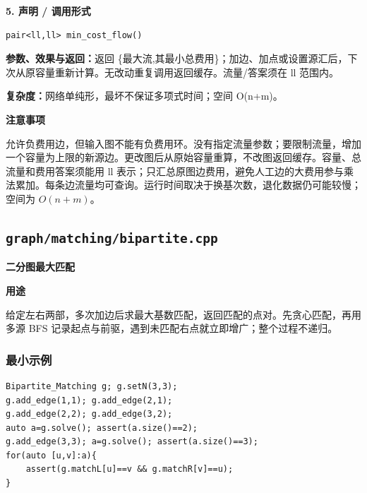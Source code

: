 \documentclass[UTF8,a4paper,10pt]{ctexart}
\newcommand{\TemplUsage}[1]{\textbf{用途}\par #1\par}
\newcommand{\TemplNote}[1]{\textbf{注意事项}\par #1\par}
\begin{document}
\noindent\begin{minipage}{\textwidth}
\textbf{5. 声明 / 调用形式}
\begin{lstlisting}
pair<ll,ll> min_cost_flow()
\end{lstlisting}
\textbf{参数、效果与返回：}返回 \{最大流,其最小总费用\}；加边、加点或设置源汇后，下次从原容量重新计算。无改动重复调用返回缓存。流量/答案须在 ll 范围内。

\textbf{复杂度：}网络单纯形，最坏不保证多项式时间；空间 O(n+m)。

\TemplNote{允许负费用边，但输入图不能有负费用环。没有指定流量参数；要限制流量，增加一个容量为上限的新源边。更改图后从原始容量重算，不改图返回缓存。容量、总流量和费用答案须能用 ll 表示；只汇总原图边费用，避免人工边的大费用参与乘法累加。每条边流量均可查询。运行时间取决于换基次数，退化数据仍可能较慢；空间为 $O(n+m)$。}
\end{minipage}\par\vspace{0.4em}
\clearpage
\subsection{\texttt{graph/matching/bipartite.cpp}}
\textbf{二分图最大匹配}\par
\TemplUsage{给定左右两部，多次加边后求最大基数匹配，返回匹配的点对。先贪心匹配，再用多源 BFS 记录起点与前驱，遇到未匹配右点就立即增广；整个过程不递归。}
\subsubsection*{最小示例}
\begin{lstlisting}
Bipartite_Matching g; g.setN(3,3);
g.add_edge(1,1); g.add_edge(2,1);
g.add_edge(2,2); g.add_edge(3,2);
auto a=g.solve(); assert(a.size()==2);
g.add_edge(3,3); a=g.solve(); assert(a.size()==3);
for(auto [u,v]:a){
    assert(g.matchL[u]==v && g.matchR[v]==u);
}
\end{lstlisting}
\end{document}

